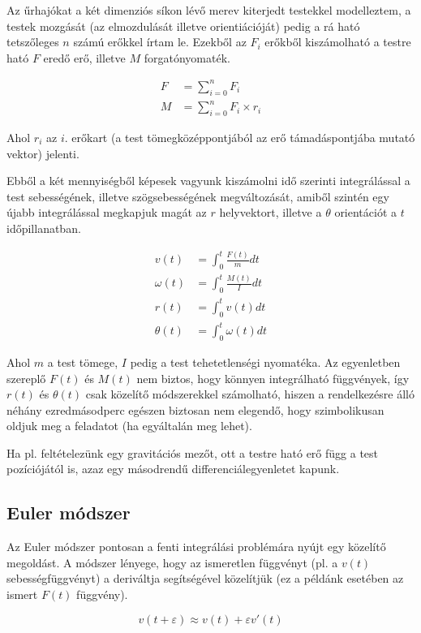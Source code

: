 Az űrhajókat a két dimenziós síkon lévő merev kiterjedt testekkel modelleztem, a
testek mozgását (az elmozdulását illetve orientiációját) pedig a rá ható
tetszőleges $n$ számú erőkkel írtam le. Ezekből az $F_i$ erőkből kiszámolható a
testre ható $F$ eredő erő, illetve $M$ forgatónyomaték.

\begin{align*}
F &= \sum_{i=0}^{n} F_i \\
M &= \sum_{i=0}^{n} F_i \times r_i
\end{align*}

Ahol $r_i$ az $i$. erőkart (a test tömegközéppontjából az erő támadáspontjába
mutató vektor) jelenti.

Ebből a két mennyiségből képesek vagyunk kiszámolni idő szerinti integrálással a
test sebességének, illetve szögsebességének megváltozását, amiből szintén egy
újabb integrálással megkapjuk magát az $r$ helyvektort, illetve a $\theta$
orientációt a $t$ időpillanatban.

\begin{align*}
v(t) &= \int_{0}^{t} \frac{F(t)}{m} dt \\
\omega(t) &= \int_{0}^{t} \frac{M(t)}{I} dt \\
r(t) &= \int_{0}^{t} v(t) dt \\
\theta(t) &= \int_{0}^{t} \omega(t) dt
\end{align*}

Ahol $m$ a test tömege, $I$ pedig a test tehetetlenségi nyomatéka.  Az
egyenletben szereplő $F(t)$ és $M(t)$ nem biztos, hogy könnyen integrálható
függvények, így $r(t)$ és $\theta(t)$ csak közelítő módszerekkel számolható,
hiszen a rendelkezésre álló néhány ezredmásodperc egészen biztosan nem elegendő,
hogy szimbolikusan oldjuk meg a feladatot (ha egyáltalán meg lehet).

Ha pl. feltételezünk egy gravitációs mezőt, ott a testre ható erő függ a test pozíciójától is,
azaz egy másodrendű differenciálegyenletet kapunk.

\subsection{Euler módszer}

Az Euler módszer pontosan a fenti integrálási problémára nyújt egy közelítő
megoldást. A módszer lényege, hogy az ismeretlen függvényt (pl. a $v(t)$
sebességfüggvényt) a deriváltja segítségével közelítjük (ez a példánk esetében az
ismert $F(t)$ függvény).

\[
  v(t + \varepsilon) \approx v(t) + \varepsilon v'(t)
\]

